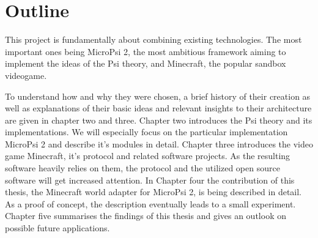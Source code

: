 \section{Outline}
This project is fundamentally about combining existing technologies. The most important ones being MicroPsi 2, the most ambitious framework aiming to implement the ideas of the Psi theory, and Minecraft, the popular sandbox videogame.

To understand how and why they were chosen, a brief history of their creation as well as explanations of their basic ideas and relevant insights to their architecture are given in chapter two and three. Chapter two introduces the Psi theory and its implementations. We will especially focus on the particular implementation MicroPsi 2 and describe it's modules in detail. Chapter three introduces the video game Minecraft, it's protocol and related software projects. As the resulting software heavily relies on them, the protocol and the utilized open source software will get increased attention. 
In Chapter four the contribution of this thesis, the Minecraft world adapter for MicroPsi 2, is being described in detail. As a proof of concept, the description eventually leads to a small experiment.
Chapter five summarises the findings of this thesis and gives an outlook on possible future applications.